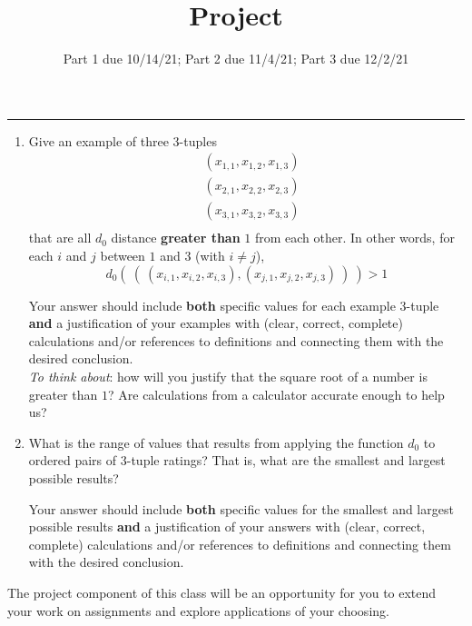 \begin{enumerate}
\rule{0.5\textwidth}{.4pt}

\begin{enumerate}
    \item Give an example of three $3$-tuples 
    \begin{align*}
    &(x_{1,1}, x_{1,2}, x_{1,3}) \\
    &(x_{2,1}, x_{2,2}, x_{2,3}) \\
    &(x_{3,1}, x_{3,2}, x_{3,3}) \\
    \end{align*}
    that are all $d_0$ distance {\bf greater than} $1$ from each other.  
    In other words, for each $i$ and $j$ between $1$ and 
    $3$ (with $i \neq j$), 
    \[
    d_{0}(~(~(x_{i,1}, x_{i,2}, x_{i,3})  , (x_{j,1}, x_{j,2}, x_{j,3})~)~) > 1
    \]
    
    Your answer should include  {\bf both} specific values for each example $3$-tuple {\bf and} a justification 
    of your examples with (clear, correct, complete) calculations and/or references to definitions and connecting them with
    the desired conclusion.\\
    
    {\it To think about}: 
    how will you justify that the square root of a number is greater than $1$?
    Are calculations from a calculator accurate enough to help us?

    \item What is the range of values that results from applying the function $d_0$
    to ordered pairs of $3$-tuple ratings? That is, what are the smallest and largest
    possible results?

    Your answer should include  {\bf both} specific values for the smallest and largest 
    possible results {\bf and} a justification 
    of your answers with (clear, correct, complete) calculations and/or references to definitions and connecting them with
    the desired conclusion.
\end{enumerate}
\end{enumerate}
\newpage

\title{Project}
\date{Part 1 due 10/14/21; Part 2 due 11/4/21; Part 3 due 12/2/21}


\maketitle
\thispagestyle{fancy}
The project component of this class will be an opportunity for you to extend your 
work on assignments and explore applications of your choosing. 

